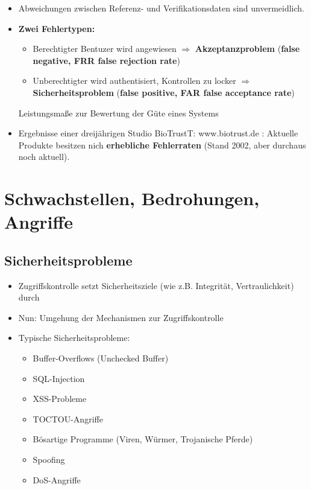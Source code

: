 \documentclass[openany]{book}
\begin{document}
\begin{itemize}
    \item Abweichungen zwischen Referenz- und Verifikationsdaten sind unvermeidlich.
    \item \textbf{Zwei Fehlertypen:}
    \begin{itemize}
        \item Berechtigter Bentuzer wird angewiesen $\Rightarrow$ \textbf{Akzeptanzproblem} (\textbf{false negative, FRR false rejection rate})
        \item Unberechtigter wird authentisiert, Kontrollen zu locker $\Rightarrow$ \textbf{Sicherheitsproblem} (\textbf{false positive, FAR false acceptance rate})
    \end{itemize}
    Leistungsmaße zur Bewertung der Güte eines Systems
    \item Ergebnisse einer dreijährigen Studio BioTrustT: www.biotrust.de : Aktuelle Produkte besitzen nich \textbf{erhebliche Fehlerraten} (Stand 2002, aber durchaus noch aktuell).
\end{itemize}

\chapter{Schwachstellen, Bedrohungen, Angriffe}

\section{Sicherheitsprobleme}

\begin{itemize}
    \item Zugriffskontrolle setzt Sicherheitsziele (wie z.B. Integrität, Vertraulichkeit) durch
    \item Nun: Umgehung der Mechanismen zur Zugriffskontrolle
    \item Typische Sicherheitsprobleme:
    \begin{itemize}
        \item Buffer-Overflows (Unchecked Buffer)
        \item SQL-Injection
        \item XSS-Probleme
        \item TOCTOU-Angriffe
        \item Bösartige Programme (Viren, Würmer, Trojanische Pferde)
        \item Spoofing
        \item DoS-Angriffe
    \end{itemize}
\end{itemize}
\end{document}

